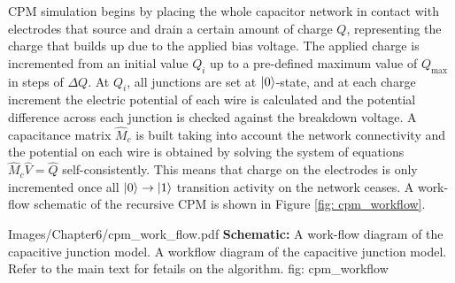 CPM simulation \cite{fairfield2016} begins by placing the whole capacitor network in contact with electrodes that source and drain a certain amount of charge $Q$, representing the charge that builds up due to the applied bias voltage. The applied charge is incremented from an initial value $Q_i$ up to a pre-defined maximum value of $Q_{\textrm{max}}$ in steps of $\Delta Q$. At $Q_i$, all junctions are set at $|0\rangle$-state, and at each charge increment the electric potential of each wire is calculated and the potential difference across each junction is checked against the breakdown voltage. A capacitance matrix $\hat{M}_c$ is built taking into account the network connectivity and the potential on each wire is obtained by solving the system of equations $\hat{M}_c \hat{V} = \hat{Q}$ self-consistently. This means that charge on the electrodes is only incremented once all $|0\rangle\rightarrow |1\rangle$ transition activity on the network ceases. A work-flow schematic of the recursive CPM is shown in Figure \ref{fig: cpm_workflow}.

{Images/Chapter6/cpm_work_flow.pdf}
{\textbf{Schematic:} A work-flow diagram of the capacitive junction model.}
{A workflow diagram of the capacitive junction model. Refer to the main text for fetails on the algorithm.}
{fig: cpm_workflow}


